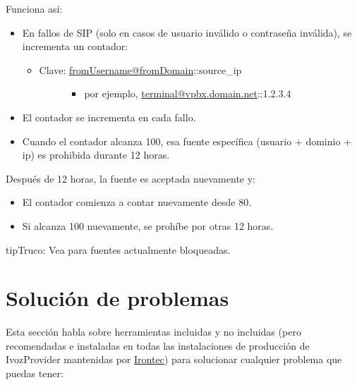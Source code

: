 \documentclass[letterpaper,10pt,spanish]{sphinxmanual}
\begin{document}
Funciona así:
\begin{itemize}
\item {} 
En fallos de SIP (solo en casos de usuario inválido o contraseña inválida), se incrementa un contador:
\begin{itemize}
\item {} \begin{description}
\item[{Clave: \href{mailto:fromUsername@fromDomain}{fromUsername@fromDomain}::source\_ip}] \leavevmode\begin{itemize}
\item {} 
por ejemplo, \href{mailto:terminal@vpbx.domain.net}{terminal@vpbx.domain.net}::1.2.3.4

\end{itemize}

\end{description}

\end{itemize}

\item {} 
El contador se incrementa en cada fallo.

\item {} 
Cuando el contador alcanza 100, esa fuente específica (usuario + dominio + ip) es prohibida durante 12 horas.

\end{itemize}

Después de 12 horas, la fuente es aceptada nuevamente y:
\begin{itemize}
\item {} 
El contador comienza a contar nuevamente desde 80.

\item {} 
Si alcanza 100 nuevamente, se prohíbe por otras 12 horas.

\end{itemize}

\begin{notice}{tip}{Truco:}
Vea {\hyperref[administration_portal/brand/views/bruteforce_attacks:brute\string-force\string-attacks]{}} para fuentes actualmente bloqueadas.
\end{notice}


\chapter{Solución de problemas}
\label{security_and_maintenance/maintenance/index::doc}\label{security_and_maintenance/maintenance/index:troubleshooting}
Esta sección habla sobre herramientas incluidas y no incluidas (pero recomendadas e instaladas en todas las instalaciones de producción de IvozProvider mantenidas por \href{https://www.irontec.com}{Irontec}) para solucionar cualquier problema que puedas tener:
\end{document}
